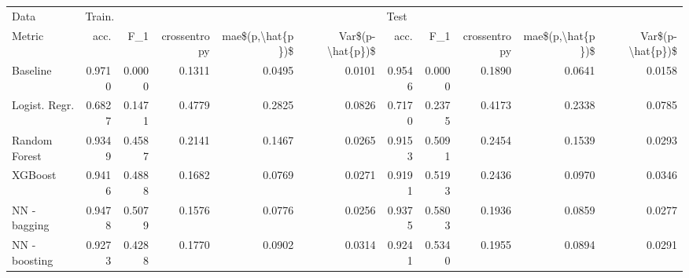 \begin{tabular}{lrrrrrrrrrr}
\toprule
Data & \multicolumn{5}{l}{Train.} & \multicolumn{5}{l}{Test} \\
Metric &    acc. &     F\_1 & crossentropy & mae\$(p,\textbackslash hat\{p\})\$ & Var\$(p-\textbackslash hat\{p\})\$ &    acc. &     F\_1 & crossentropy & mae\$(p,\textbackslash hat\{p\})\$ & Var\$(p-\textbackslash hat\{p\})\$ \\
\midrule
Baseline      &  0.9710 &  0.0000 &       0.1311 &           0.0495 &           0.0101 &  0.9546 &  0.0000 &       0.1890 &           0.0641 &           0.0158 \\
Logist. Regr. &  0.6827 &  0.1471 &       0.4779 &           0.2825 &           0.0826 &  0.7170 &  0.2375 &       0.4173 &           0.2338 &           0.0785 \\
Random Forest &  0.9349 &  0.4587 &       0.2141 &           0.1467 &           0.0265 &  0.9153 &  0.5091 &       0.2454 &           0.1539 &           0.0293 \\
XGBoost       &  0.9416 &  0.4888 &       0.1682 &           0.0769 &           0.0271 &  0.9191 &  0.5193 &       0.2436 &           0.0970 &           0.0346 \\
NN - bagging  &  0.9478 &  0.5079 &       0.1576 &           0.0776 &           0.0256 &  0.9375 &  0.5803 &       0.1936 &           0.0859 &           0.0277 \\
NN - boosting &  0.9273 &  0.4288 &       0.1770 &           0.0902 &           0.0314 &  0.9241 &  0.5340 &       0.1955 &           0.0894 &           0.0291 \\
\bottomrule
\end{tabular}

